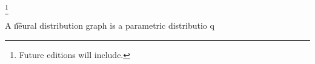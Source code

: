 
\footnote{Future editions will include.}


A \t{neural distribution graph} is a parametric distributio  q

\blankpage
